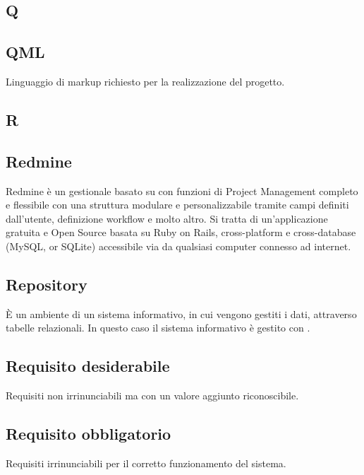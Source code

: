 \newpage

\begin{center}
\Huge\section{\uppercase{Q}}
\end{center}

\subsection{QML}
Linguaggio di markup richiesto per la realizzazione del progetto.

\newpage

\begin{center}
\Huge\section{\uppercase{R}}
\end{center}

\subsection{Redmine}
Redmine è un  gestionale basato su  con funzioni di Project Management completo e flessibile con una struttura modulare e personalizzabile tramite campi definiti dall'utente, definizione workflow e molto altro.
Si tratta di un'applicazione gratuita e Open Source basata su  Ruby on Rails, cross-platform e cross-database (MySQL,  or SQLite) accessibile via  da qualsiasi computer connesso ad internet.

\subsection{Repository}
È un ambiente di un sistema informativo, in cui vengono gestiti i dati, attraverso
tabelle relazionali. In questo caso il sistema informativo è gestito con .

\subsection{Requisito desiderabile}
Requisiti non irrinunciabili ma con un valore aggiunto riconoscibile.

\subsection{Requisito obbligatorio}
Requisiti irrinunciabili per il corretto funzionamento del sistema.


